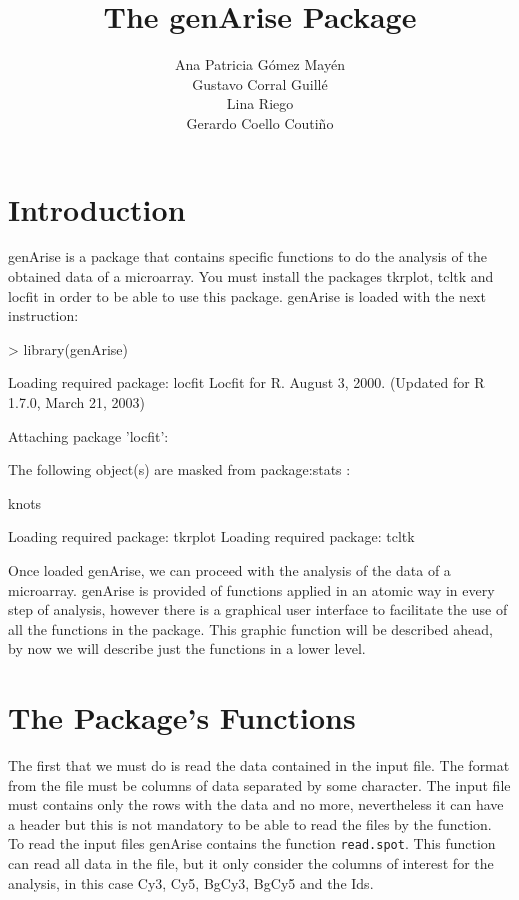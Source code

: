 \documentclass[12pt]{article}
\title{The genArise Package}
\author{Ana Patricia G\'omez May\'en\\ Gustavo Corral Guill\'e\\ Lina Riego\\ Gerardo Coello Couti\~no}
\begin{document}
\maketitle

\section{Introduction}

genArise is a package that contains specific functions to do the analysis of the obtained data of a microarray. You must install the packages tkrplot, tcltk and locfit in order to be able to use this package. genArise is loaded with the next instruction:\\
\begin{Schunk}
\begin{Sinput}
> library(genArise)
\end{Sinput}
\begin{Soutput}
Loading required package: locfit 
Locfit for R.
August 3, 2000.  (Updated for R 1.7.0, March 21, 2003)

Attaching package 'locfit':


	The following object(s) are masked from package:stats :

	 knots 

Loading required package: tkrplot 
Loading required package: tcltk 
\end{Soutput}
\end{Schunk}
Once loaded genArise, we can proceed with the analysis of the data of a microarray. genArise is provided of functions applied in an atomic way in every step of analysis, however there is a graphical user interface to facilitate the use of all the functions in the package. This graphic function will be described ahead, by now we will describe just the functions in a lower level.

\section{The Package's Functions}
The first that we must do is read the data contained in the input file. The format from the file must be columns of data separated by some character. The input file must contains only the rows with the data and no more, nevertheless it can have a header but this is not mandatory  to be able to read the files by the function.\\

To read the input files genArise contains the function \texttt{read.spot}. This function can read all data in the file, but it only consider the columns of interest for the analysis, in this case Cy3, Cy5, BgCy3, BgCy5 and the Ids.\\
\end{document}
